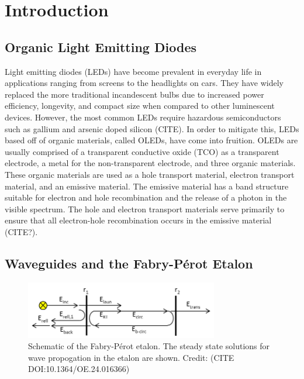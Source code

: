 \documentclass{report}
\begin{document}
\tableofcontents

\chapter{Introduction} \label{intro}

    \section{Organic Light Emitting Diodes}
        Light emitting diodes (LEDs) have become prevalent in everyday life in applications ranging from screens to the headlights on cars. They have widely replaced the more traditional incandescent bulbs due to increased power efficiency, longevity, and compact size when compared to other luminescent devices. However, the most common LEDs require hazardous semiconductors such as gallium and arsenic doped silicon (CITE). In order to mitigate this, LEDs based off of organic materials, called OLEDs, have come into fruition. OLEDs are usually comprised of a transparent conductive oxide (TCO) as a transparent electrode, a metal for the non-transparent electrode, and three organic materials. These organic materials are used as a hole transport material, electron transport material, and an emissive material. The emissive material has a band structure suitable for electron and hole recombination and the release of a photon in the visible spectrum. The hole and electron transport materials serve primarily to ensure that all electron-hole recombination occurs in the emissive material (CITE?).
        
    \section{Waveguides and the Fabry-P\'erot Etalon}
        \begin{figure}
            \centering
            \includegraphics[width=0.75\textwidth]{images/etalon_schematic.png}
            \caption{Schematic of the Fabry-P\'erot etalon. The steady state solutions for wave propogation in the etalon are shown. Credit: (CITE DOI:10.1364/OE.24.016366)}
            \label{fig:etalon}
        \end{figure}
\end{document}
